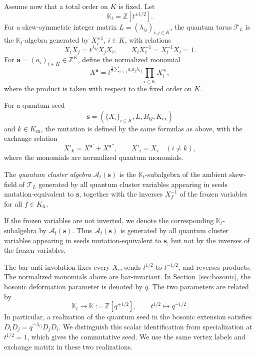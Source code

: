 \documentclass[12pt, reqno]{amsart}
\theoremstyle{plain}
\theoremstyle{definition}
\numberwithin{equation}{section}
\begin{document}
Assume now that a total order on \(K\) is fixed. Let
\[
\mathbb K_t=\mathbb Z[t^{\pm1/2}].
\]
For a skew-symmetric integer matrix \(L=(\lambda_{ij})_{i,j\in K}\), the
quantum torus \(\mathcal T_L\) is the \(\mathbb K_t\)-algebra generated by
\(X_i^{\pm1}\), \(i\in K\), with relations
\[
X_iX_j=t^{\lambda_{ij}}X_jX_i,
\qquad
X_iX_i^{-1}=X_i^{-1}X_i=1.
\]
For \(\mathbf a=(a_i)_{i\in K}\in\mathbb Z^K\), define the normalized monomial
\[
X^{\mathbf a}
=
t^{\frac12\sum_{i>j}a_ia_j\lambda_{ij}}
\prod_{i\in K}X_i^{a_i},
\]
where the product is taken with respect to the fixed order on \(K\).

For a quantum seed
\[
\mathbf s=(\{X_i\}_{i\in K},L,B_Q,K_{\operatorname{ex}})
\]
and \(k\in K_{\operatorname{ex}}\), the mutation is defined by the same formulas
as above, with the exchange relation
\[
X'_k=X^{\mathbf a'}+X^{\mathbf a''},
\qquad
X'_i=X_i\quad (i\ne k),
\]
where the monomials are normalized quantum monomials.

The \emph{quantum cluster algebra} \(\mathcal A_t(\mathbf s)\) is the
\(\mathbb K_t\)-subalgebra of the ambient skew-field of \(\mathcal T_L\)
generated by all quantum cluster variables appearing in seeds
mutation-equivalent to \(\mathbf s\), together with the inverses
\(X_f^{-1}\) of the frozen variables for all \(f\in K_{\operatorname{fr}}\).

If the frozen variables are not inverted, we denote the corresponding
\(\mathbb K_t\)-subalgebra by \(\overline{\mathcal A}_t(\mathbf s)\).
Thus \(\overline{\mathcal A}_t(\mathbf s)\) is generated by all quantum
cluster variables appearing in seeds mutation-equivalent to \(\mathbf s\),
but not by the inverses of the frozen variables.

The bar anti-involution fixes every \(X_i\), sends
\(t^{1/2}\) to \(t^{-1/2}\), and reverses products. The normalized
monomials above are bar-invariant. In Section~\ref{sec:bosonic}, the
bosonic deformation parameter is denoted by \(q\). The two parameters
are related by
\begin{equation}\label{eq:quantum-parameter-convention}
\mathbb K_t\longrightarrow\mathbb K:=\mathbb Z[q^{\pm1/2}],
\qquad t^{1/2}\longmapsto q^{-1/2}.
\end{equation}
In particular, a realization of the quantum seed in the bosonic extension
satisfies \(D_iD_j=q^{-\lambda_{ij}}D_jD_i\).
We distinguish this scalar identification from specialization at
\(t^{1/2}=1\), which gives the commutative seed. We use the same vertex
labels and exchange matrix in these two realizations.
\end{document}
